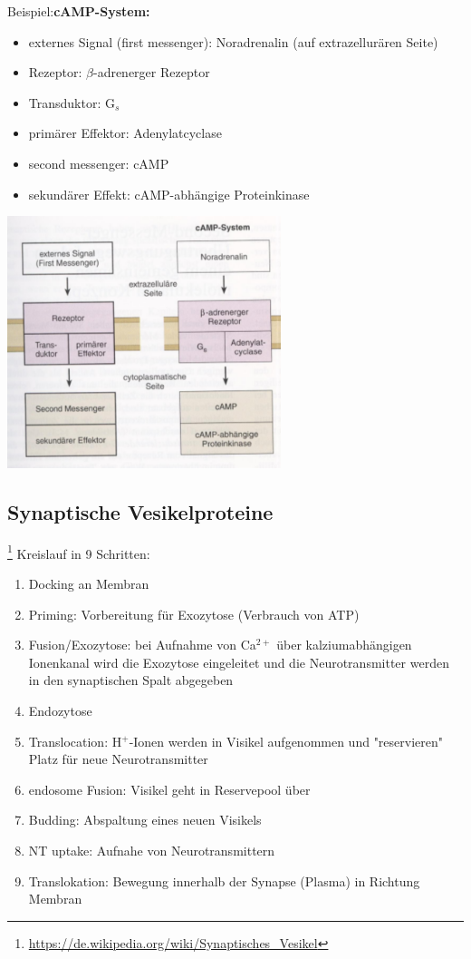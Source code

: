 Beispiel:\textbf{cAMP-System:}
\begin{itemize}
	\item externes Signal (first messenger): Noradrenalin (auf extrazellurären Seite)
	\item Rezeptor: $\beta$-adrenerger Rezeptor
	\item Transduktor: G$_s$
	\item primärer Effektor: Adenylatcyclase
	\item second messenger: cAMP
	\item sekundärer Effekt: cAMP-abhängige Proteinkinase
\end{itemize}
\includegraphics[width=0.6\textwidth]{lectures/160601/pix/1.png}

\subsection{Synaptische Vesikelproteine}\footnote{\url{https://de.wikipedia.org/wiki/Synaptisches_Vesikel}}
Kreislauf in 9 Schritten:
\begin{enumerate}
	\item Docking an Membran
	\item Priming: Vorbereitung für Exozytose (Verbrauch von ATP)
	\item Fusion/Exozytose: bei Aufnahme von Ca$^{2+}$ über kalziumabhängigen Ionenkanal wird die Exozytose eingeleitet und die Neurotransmitter werden in den synaptischen Spalt abgegeben
	\item Endozytose
	\item Translocation: H$^+$-Ionen werden in Visikel aufgenommen und "reservieren" Platz für neue Neurotransmitter
	\item endosome Fusion: Visikel geht in Reservepool über
	\item Budding: Abspaltung eines neuen Visikels
	\item NT uptake: Aufnahe von Neurotransmittern
	\item Translokation: Bewegung innerhalb der Synapse (Plasma) in Richtung Membran
\end{enumerate}